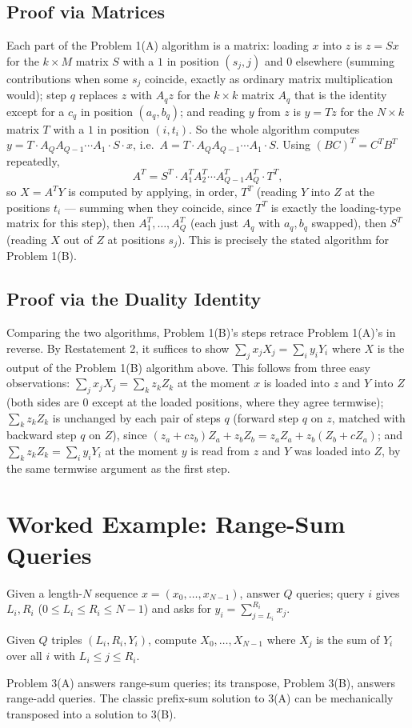 \documentclass[11pt]{article}
\begin{document}
\subsection{Proof via Matrices}
Each part of the Problem 1(A) algorithm is a matrix: loading $x$ into
$z$ is $z=Sx$ for the $k\times M$ matrix $S$ with a $1$ in position
$(s_j,j)$ and $0$ elsewhere (summing contributions when some $s_j$
coincide, exactly as ordinary matrix multiplication would); step $q$
replaces $z$ with $A_qz$ for the $k\times k$ matrix $A_q$ that is the
identity except for a $c_q$ in position $(a_q,b_q)$; and reading $y$
from $z$ is $y=Tz$ for the $N\times k$ matrix $T$ with a $1$ in
position $(i,t_i)$. So the whole algorithm computes
$y = T\cdot A_QA_{Q-1}\cdots A_1\cdot S\cdot x$, i.e.\
$A = T\cdot A_QA_{Q-1}\cdots A_1\cdot S$. Using $(BC)^T=C^TB^T$
repeatedly,
\[
  A^T = S^T\cdot A_1^TA_2^T\cdots A_{Q-1}^TA_Q^T\cdot T^T,
\]
so $X=A^TY$ is computed by applying, in order, $T^T$ (reading $Y$ into
$Z$ at the positions $t_i$ --- summing when they coincide, since $T^T$
is exactly the loading-type matrix for this step), then
$A_1^T,\ldots,A_Q^T$ (each just $A_q$ with $a_q,b_q$ swapped), then
$S^T$ (reading $X$ out of $Z$ at positions $s_j$). This is precisely
the stated algorithm for Problem 1(B).

\subsection{Proof via the Duality Identity}
Comparing the two algorithms, Problem 1(B)'s steps retrace Problem
1(A)'s in reverse. By Restatement 2, it suffices to show
$\sum_jx_jX_j=\sum_iy_iY_i$ where $X$ is the output of the Problem
1(B) algorithm above. This follows from three easy observations:
$\sum_jx_jX_j=\sum_kz_kZ_k$ at the moment $x$ is loaded into $z$ and
$Y$ into $Z$ (both sides are $0$ except at the loaded positions, where
they agree termwise); $\sum_kz_kZ_k$ is unchanged by each pair of
steps $q$ (forward step $q$ on $z$, matched with backward step $q$ on
$Z$), since
$(z_a+cz_b)Z_a + z_bZ_b = z_aZ_a + z_b(Z_b+cZ_a)$; and
$\sum_kz_kZ_k=\sum_iy_iY_i$ at the moment $y$ is read from $z$ and $Y$
was loaded into $Z$, by the same termwise argument as the first step.

\section{Worked Example: Range-Sum Queries}
\begin{definitionbox}[Problem 3(A)]
Given a length-$N$ sequence $x=(x_0,\ldots,x_{N-1})$, answer $Q$
queries; query $i$ gives $L_i,R_i$ ($0\le L_i\le R_i\le N-1$) and asks
for $y_i=\sum_{j=L_i}^{R_i}x_j$.
\end{definitionbox}
\begin{definitionbox}
Given $Q$ triples $(L_i,R_i,Y_i)$, compute
$X_0,\ldots,X_{N-1}$ where $X_j$ is the sum of $Y_i$ over all $i$ with
$L_i\le j\le R_i$.
\end{definitionbox}
Problem 3(A) answers range-sum queries; its transpose, Problem 3(B),
answers range-add queries. The classic prefix-sum solution to 3(A) can
be mechanically transposed into a solution to 3(B).
\end{document}
